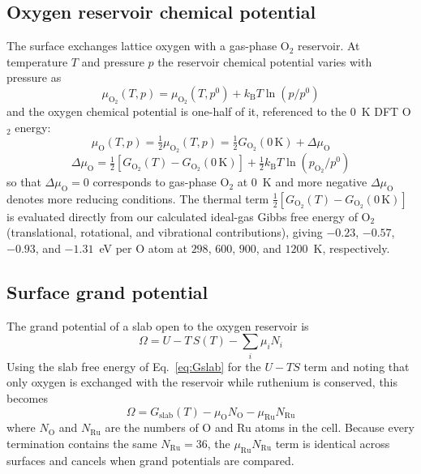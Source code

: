 \subsection*{Oxygen reservoir chemical potential}
The surface exchanges lattice oxygen with a gas-phase O$_2$ reservoir. At
temperature $T$ and pressure $p$ the reservoir chemical potential varies with
pressure as
\begin{equation}
  \mu_{\mathrm{O_2}}(T,p) = \mu_{\mathrm{O_2}}(T,p^{0})
  + k_{\mathrm B}T\ln\!\left(p/p^{0}\right)
  \label{eq:muO2}
\end{equation}
and the oxygen chemical potential is one-half of it, referenced to the $0$~K DFT
O$_2$ energy:
\begin{equation}
  \mu_{\mathrm O}(T,p) = \tfrac{1}{2}\mu_{\mathrm{O_2}}(T,p)
  = \tfrac{1}{2}G_{\mathrm{O_2}}(0\,\mathrm{K}) + \Delta\mu_{\mathrm O}
  \label{eq:muO}
\end{equation}
\begin{equation}
  \Delta\mu_{\mathrm O} =
  \tfrac{1}{2}\left[G_{\mathrm{O_2}}(T) - G_{\mathrm{O_2}}(0\,\mathrm{K})\right]
  + \tfrac{1}{2}k_{\mathrm B}T\ln\!\left(p_{\mathrm{O_2}}/p^{0}\right)
  \label{eq:dmuO}
\end{equation}
so that $\Delta\mu_{\mathrm O}=0$ corresponds to gas-phase O$_2$ at $0$~K and more
negative $\Delta\mu_{\mathrm O}$ denotes more reducing conditions. The thermal term
$\tfrac{1}{2}[G_{\mathrm{O_2}}(T)-G_{\mathrm{O_2}}(0\,\mathrm{K})]$ is evaluated
directly from our calculated ideal-gas Gibbs free energy of O$_2$ (translational,
rotational, and vibrational contributions), giving $-0.23$, $-0.57$, $-0.93$, and
$-1.31$~eV per O atom at $298$, $600$, $900$, and $1200$~K, respectively.

\subsection*{Surface grand potential}
The grand potential of a slab open to the oxygen reservoir is
\begin{equation}
  \Omega = U - T\,S(T) - \sum_i \mu_i N_i
  \label{eq:Omega_gen}
\end{equation}
Using the slab free energy of Eq.~\eqref{eq:Gslab} for the $U-TS$ term and noting
that only oxygen is exchanged with the reservoir while ruthenium is conserved,
this becomes
\begin{equation}
  \Omega = G_{\mathrm{slab}}(T) - \mu_{\mathrm O} N_{\mathrm O}
  - \mu_{\mathrm{Ru}} N_{\mathrm{Ru}}
  \label{eq:Omega_surf}
\end{equation}
where $N_{\mathrm O}$ and $N_{\mathrm{Ru}}$ are the numbers of O and Ru atoms in
the cell. Because every termination contains the same $N_{\mathrm{Ru}}=36$, the
$\mu_{\mathrm{Ru}}N_{\mathrm{Ru}}$ term is identical across surfaces and cancels
when grand potentials are compared.

